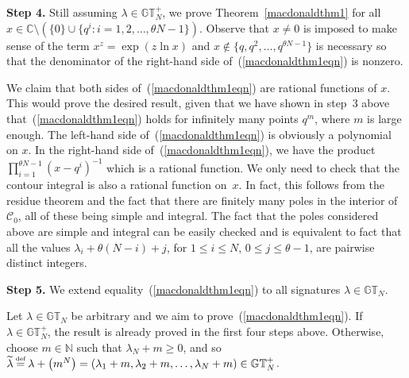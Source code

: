 \documentclass[pdftex]{sigma}
\numberwithin{equation}{section}
\newcommand\myeq{\mathrel{\stackrel{\makebox[0pt]{\mbox{\normalfont\tiny def}}}{=}}}
\newcommand{\C}{\mathbb{C}}
\newcommand{\N}{\mathbb{N}}
\newcommand{\CC}{\mathcal{C}}
\newcommand{\GT}{\mathbb{GT}}
\newcommand{\GTp}{\mathbb{GT}^+}
\begin{document}
\textbf{Step 4.} Still assuming $\lambda\in\GTp_N$, we prove Theorem~\ref{macdonaldthm1} for all $x\in\C \setminus (\{0\}\cup\{q^i \colon i = 1, 2, \dots, \theta N - 1\})$. Observe that $x\neq 0$ is imposed to make sense of the term $x^z = \exp(z\ln{x})$ and $x\notin\{q, q^2, \dots, q^{\theta N - 1}\}$ is necessary so that the denominator of the right-hand side of~(\ref{macdonaldthm1eqn}) is nonzero.

We claim that both sides of~(\ref{macdonaldthm1eqn}) are rational functions of $x$. This would prove the desired result, given that we have shown in step~3 above that~(\ref{macdonaldthm1eqn}) holds for inf\/initely many points $q^m$, where $m$ is large enough. The left-hand side of~(\ref{macdonaldthm1eqn}) is obviously a polynomial on $x$. In the right-hand side of~(\ref{macdonaldthm1eqn}), we have the product $\prod\limits_{i=1}^{\theta N - 1}{(x - q^i)^{-1}}$ which is a rational function. We only need to check that the contour integral is also a rational function on~$x$. In fact, this follows from the residue theorem and the fact that there are f\/initely many poles in the interior of~$\CC_0$, all of these being simple and integral. The fact that the poles considered above are simple and integral can be easily checked and is equivalent to fact that all the values $\lambda_i + \theta(N - i) + j$, for $1\leq i\leq N$, $0\leq j\leq \theta - 1$, are pairwise distinct integers.

\textbf{Step 5.} We extend equality~(\ref{macdonaldthm1eqn}) to all signatures $\lambda\in\GT_N$.

Let $\lambda\in\GT_N$ be arbitrary and we aim to prove~(\ref{macdonaldthm1eqn}). If $\lambda\in\GTp_N$, the result is already proved in the f\/irst four steps above. Otherwise, choose $m\in\N$ such that $\lambda_N + m \geq 0$, and so $\widetilde{\lambda} \myeq \lambda + \big(m^N\big) = (\lambda_1 + m, \lambda_2 + m, \dots, \lambda_N + m)\in\GTp_N$.
\end{document}
